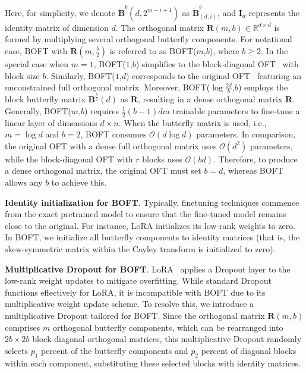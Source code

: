 Here, for simplicity, we denote $\tilde{\bm{B}}^b(d,2^{m - i+1})$ as $\tilde{\bm{B}}^b_{(d,i)}$, and $\bm{I}_d$ represents the identity matrix of dimension $d$. The orthogonal matrix $\bm{R}(m,b)\in\mathbb{R}^{d\times d}$ is formed by multiplying several orthogonal butterfly components. For notational ease, BOFT with $\bm{R}(m,\frac{b}{2})$ is referred to as BOFT($m$,$b$), where $b\geq 2$. In the special case when $m=1$, BOFT($1$,$b$) simplifies to the block-diagonal OFT~\cite{qiu2023controlling} with block size $b$. Similarly, BOFT($1$,$d$) corresponds to the original OFT~\cite{qiu2023controlling} featuring an unconstrained full orthogonal matrix. Moreover, BOFT($\log \frac{2d}{b}$,$b$) employs the block butterfly matrix $\bm{B}^{\frac{b}{2}}(d)$ as $\bm{R}$, resulting in a dense orthogonal matrix $\bm{R}$. Generally, BOFT($m$,$b$) requires $\frac{1}{2}(b-1)dm$ trainable parameters to fine-tune a linear layer of dimensions $d\times n$. When the butterfly matrix is used, i.e., $m=\log d$ and $b=2$, BOFT consumes $\mathcal{O}(d\log d)$ parameters. In comparison, the original OFT with a dense full orthogonal matrix uses $\mathcal{O}(d^2)$ parameters, while the block-diagonal OFT with $r$ blocks uses $\mathcal{O}(bd)$. Therefore, to produce a dense orthogonal matrix, the original OFT must set $b=d$, whereas BOFT allows any $b$ to achieve this.

\textbf{Identity initialization for BOFT}. Typically, finetuning techniques commence from the exact pretrained model to ensure that the fine-tuned model remains close to the original. For instance, LoRA initializes its low-rank weights to zero. In BOFT, we initialize all butterfly components to identity matrices (that is, the skew-symmetric matrix within the Cayley transform is initialized to zero).

\textbf{Multiplicative Dropout for BOFT}. LoRA~\cite{hulora2022} applies a Dropout layer to the low-rank weight updates to mitigate overfitting. While standard Dropout~\cite{srivastava2014dropout} functions effectively for LoRA, it is incompatible with BOFT due to its multiplicative weight update scheme. To resolve this, we introduce a multiplicative Dropout tailored for BOFT. Since the orthogonal matrix $\bm{R}(m,b)$ comprises $m$ orthogonal butterfly components, which can be rearranged into $2b\times 2b$ block-diagonal orthogonal matrices, this multiplicative Dropout randomly selects $p_1$ percent of the butterfly components and $p_2$ percent of diagonal blocks within each component, substituting these selected blocks with identity matrices.

